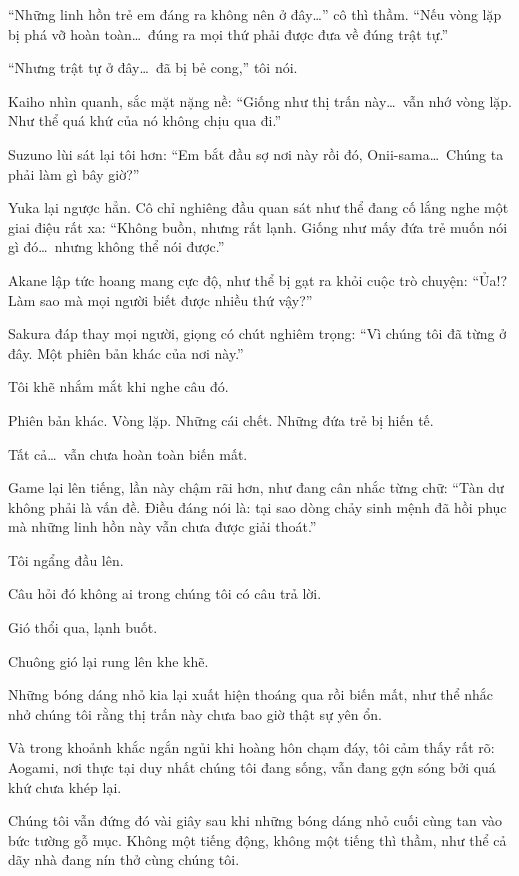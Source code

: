 \documentclass[../main.tex]{subfiles}
\begin{document}
``Những linh hồn trẻ em đáng ra không nên ở đây\dots'' cô thì thầm. ``Nếu vòng lặp bị phá vỡ hoàn toàn\dots\ đúng ra mọi thứ phải được đưa về đúng trật tự.''

``Nhưng trật tự ở đây\dots\ đã bị bẻ cong,'' tôi nói.

Kaiho nhìn quanh, sắc mặt nặng nề: ``Giống như thị trấn này\dots\ vẫn nhớ vòng lặp. Như thể quá khứ của nó không chịu qua đi.''

Suzuno lùi sát lại tôi hơn: ``Em bắt đầu sợ nơi này rồi đó, Onii-sama\dots\ Chúng ta phải làm gì bây giờ?''

Yuka lại ngược hẳn. Cô chỉ nghiêng đầu quan sát như thể đang cố lắng nghe một giai điệu rất xa: ``Không buồn, nhưng rất lạnh. Giống như mấy đứa trẻ muốn nói gì đó\dots\ nhưng không thể nói được.''

Akane lập tức hoang mang cực độ, như thể bị gạt ra khỏi cuộc trò chuyện: ``Ủa!? Làm sao mà mọi người biết được nhiều thứ vậy?''

Sakura đáp thay mọi người, giọng có chút nghiêm trọng: ``Vì chúng tôi đã từng ở đây. Một phiên bản khác của nơi này.''

Tôi khẽ nhắm mắt khi nghe câu đó.

Phiên bản khác. Vòng lặp. Những cái chết. Những đứa trẻ bị hiến tế.

Tất cả\dots\ vẫn chưa hoàn toàn biến mất.

Game lại lên tiếng, lần này chậm rãi hơn, như đang cân nhắc từng chữ: ``Tàn dư không phải là vấn đề. Điều đáng nói là: tại sao dòng chảy sinh mệnh đã hồi phục mà những linh hồn này vẫn chưa được giải thoát.''

Tôi ngẩng đầu lên.

Câu hỏi đó không ai trong chúng tôi có câu trả lời.

Gió thổi qua, lạnh buốt.

Chuông gió lại rung lên khe khẽ.

Những bóng dáng nhỏ kia lại xuất hiện thoáng qua rồi biến mất, như thể nhắc nhở chúng tôi rằng thị trấn này chưa bao giờ thật sự yên ổn.

Và trong khoảnh khắc ngắn ngủi khi hoàng hôn chạm đáy, tôi cảm thấy rất rõ: Aogami, nơi thực tại duy nhất chúng tôi đang sống, vẫn đang gợn sóng bởi quá khứ chưa khép lại.

Chúng tôi vẫn đứng đó vài giây sau khi những bóng dáng nhỏ cuối cùng tan vào bức tường gỗ mục. Không một tiếng động, không một tiếng thì thầm, như thể cả dãy nhà đang nín thở cùng chúng tôi.
\end{document}
